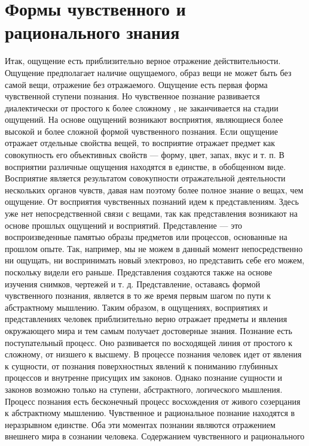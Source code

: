 \documentclass[12pt]{article}
\begin{document}
\newpage
\section{Формы чувственного и рационального знания}
Итак, ощущение есть приблизительно верное отражение действительности. Ощущение предполагает наличие
ощущаемого, образ вещи не может быть без самой вещи, отражение без отражаемого. Ощущение есть первая
форма чувственной ступени познания. Но чувственное познание развивается диалектически от простого к более
сложному , не заканчивается на стадии ощущений.
На  основе  ощущений  возникают  восприятия,  являющиеся  более  высокой  и  более  сложной  формой
чувственного познания. Если ощущение отражает отдельные свойства вещей, то восприятие отражает предмет
как совокупность его объективных свойств --- форму, цвет, запах, вкус и т. п. В восприятии различные ощущения
находятся  в  единстве,  в  обобщенном  виде.  Восприятие  является  результатом  совокупности  отражательной
деятельности нескольких органов чувств, давая нам поэтому более полное знание о вещах, чем ощущение.
От восприятия чувственных познаний идем к представлениям. Здесь уже нет непосредственной связи с вещами,
так  как  представления  возникают  на  основе  прошлых  ощущений  и  восприятий.  Представление --- это
воспроизведенные памятью образы предметов или процессов, основанные на прошлом опыте. Так, например,
мы  не  можем  в  данный  момент  непосредственно  ни  ощущать,  ни  воспринимать  новый  электровоз,  но
представить себе его можем, поскольку видели его раньше. Представления создаются также на основе изучения
снимков, чертежей и т. д. Представление, оставаясь формой чувственного познания, является в то же время
первым  шагом  по  пути  к  абстрактному  мышлению.  Таким  образом,  в  ощущениях,  восприятиях  и
представлениях человек приблизительно верно отражает предметы и явления окружающего мира и тем самым
получает достоверные знания.
Познание есть поступательный процесс. Оно развивается по восходящей линия от простого к сложному, от
низшего к высшему. В процессе познания человек идет от явления к сущности, от познания поверхностных
явлений к пониманию глубинных процессов и внутренне присущих им законов. Однако познание сущности и
законов возможно только на ступени, абстрактного, логического мышления.
Процесс познания есть бесконечный процесс восхождения от живого созерцания к абстрактному мышлению.
Чувственное  и  рациональное  познание  находятся  в  неразрывном  единстве.  Оба  эти  моментах  познании
являются  отражением  внешнего  мира  в  сознании  человека.  Содержанием  чувственного  и  рационального
\end{document}
